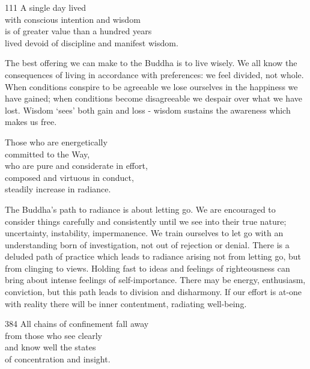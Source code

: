 \begin{dhpVerse}{111}
\label{dhp-111}
A single day lived\\
with conscious intention and wisdom\\
is of greater value than a hundred years\\
lived devoid of discipline and manifest wisdom.
\end{dhpVerse}

\begin{dhpRefl}
The best offering we can make to the Buddha is to live wisely. We all know the consequences of living in accordance with preferences: we feel divided, not whole. When conditions conspire to be agreeable we lose ourselves in the happiness we have gained; when conditions become disagreeable we despair over what we have lost. Wisdom `sees' both gain and loss - wisdom sustains the awareness which makes us free.
\end{dhpRefl}


\begin{dhpVerse}{24}
\label{dhp-24}
Those who are energetically\\
committed to the Way,\\
who are pure and considerate in effort,\\
composed and virtuous in conduct,\\
steadily increase in radiance.
\end{dhpVerse}

\begin{dhpRefl}
The Buddha's path to radiance is about letting go. We are encouraged to consider things carefully and consistently until we see into their true nature; uncertainty, instability, impermanence. We train ourselves to let go with an understanding born of investigation, not out of rejection or denial. There is a deluded path of practice which leads to radiance arising not from letting go, but from clinging to views. Holding fast to ideas and feelings of righteousness can bring about intense feelings of self-importance. There may be energy, enthusiasm, conviction, but this path leads to division and disharmony. If our effort is at-one with reality there will be inner contentment, radiating well-being.
\end{dhpRefl}


\begin{dhpVerse}{384}
\label{dhp-384}
All chains of confinement fall away\\
from those who see clearly\\
and know well the states\\
of concentration and insight.
\end{dhpVerse}


